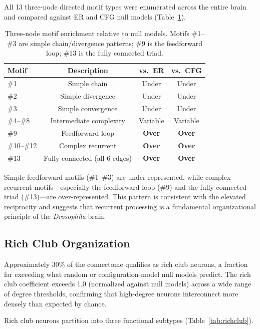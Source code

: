 \documentclass[11pt]{article}
\begin{document}
All 13 three-node directed motif types were enumerated across the entire brain and compared against ER and CFG null models (Table~\ref{tab:motifs}).

\begin{table}[ht]
\centering
\caption{Three-node motif enrichment relative to null models.  Motifs \#1--\#3 are simple chain/divergence patterns; \#9 is the feedforward loop; \#13 is the fully connected triad.}
\label{tab:motifs}
\begin{tabular}{@{}lccc@{}}
\toprule
Motif & Description & vs.\ ER & vs.\ CFG \\
\midrule
\#1 & Simple chain & Under & Under \\
\#2 & Simple divergence & Under & Under \\
\#3 & Simple convergence & Under & Under \\
\#4--\#8 & Intermediate complexity & Variable & Variable \\
\#9 & Feedforward loop & \textbf{Over} & \textbf{Over} \\
\#10--\#12 & Complex recurrent & \textbf{Over} & \textbf{Over} \\
\#13 & Fully connected (all 6 edges) & \textbf{Over} & \textbf{Over} \\
\bottomrule
\end{tabular}
\end{table}

Simple feedforward motifs (\#1--\#3) are under-represented, while complex recurrent motifs---especially the feedforward loop (\#9) and the fully connected triad (\#13)---are over-represented.  This pattern is consistent with the elevated reciprocity and suggests that recurrent processing is a fundamental organizational principle of the \emph{Drosophila} brain.

\subsection{Rich Club Organization}

Approximately 30\% of the connectome qualifies as rich club neurons, a fraction far exceeding what random or configuration-model null models predict.  The rich club coefficient exceeds 1.0 (normalized against null models) across a wide range of degree thresholds, confirming that high-degree neurons interconnect more densely than expected by chance.

Rich club neurons partition into three functional subtypes (Table~\ref{tab:richclub}).
\end{document}
